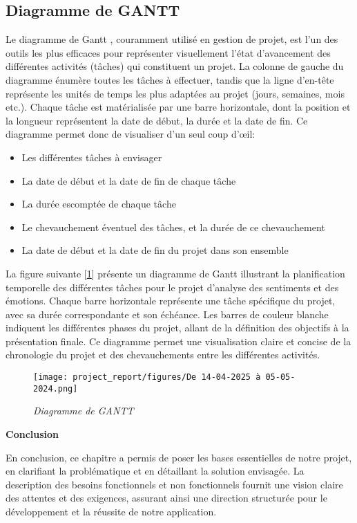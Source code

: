 \subsection{Diagramme de GANTT}
Le diagramme de Gantt \cite{gantt}, couramment utilisé en gestion de projet, est l'un des outils les plus efficaces pour représenter visuellement l'état d'avancement des différentes activités (tâches) qui constituent un projet. La colonne de gauche du diagramme énumère toutes les tâches à effectuer, tandis que la ligne d'en-tête représente les unités de temps les plus adaptées au projet (jours, semaines, mois etc.). Chaque tâche est matérialisée par une barre horizontale, dont la position et la longueur représentent la date de début, la durée et la date de fin. Ce diagramme permet donc de visualiser d'un seul coup d'œil:
\begin{itemize}
    \item Les différentes tâches à envisager
    \item La date de début et la date de fin de chaque tâche
    \item La durée escomptée de chaque tâche
    \item Le chevauchement éventuel des tâches, et la durée de ce chevauchement
    \item La date de début et la date de fin du projet dans son ensemble
\end{itemize}
La figure suivante [\ref{fig:figureGantt}] présente un diagramme de Gantt illustrant la planification temporelle des différentes tâches pour le projet d'analyse des sentiments et des émotions. Chaque barre horizontale représente une tâche spécifique du projet, avec sa durée correspondante et son échéance. Les barres de couleur blanche indiquent les différentes phases du projet, allant de la définition des objectifs à la présentation finale. Ce diagramme permet une visualisation claire et concise de la chronologie du projet et des chevauchements entre les différentes activités.
\begin{figure}[h]
    \centering
    \texttt{[image: project\_report/figures/De 14-04-2025 à 05-05-2024.png]} 
    \caption{\textit{Diagramme de GANTT}}
        \label{fig:figureGantt}
 
\end{figure} \par
\textbf{Conclusion}\par
En conclusion, ce chapitre a permis de poser les bases essentielles de notre projet, en clarifiant la problématique et en détaillant la solution envisagée. La description des besoins fonctionnels et non fonctionnels fournit une vision claire des attentes et des exigences, assurant ainsi une direction structurée pour le développement et la réussite de notre application.
  
 
